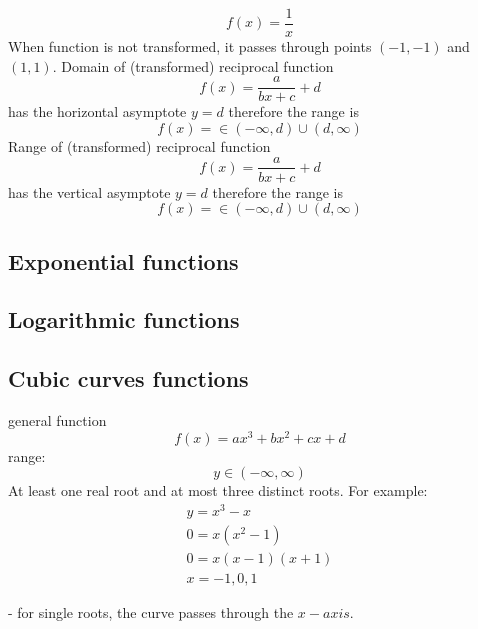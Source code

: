 \documentclass{article}
\begin{document}
\begin{equation}
  f(x) = \frac{1}{x}
\end{equation}
When function is not transformed, it passes through points $(-1, -1)$ and $(1, 1)$.
Domain of (transformed) reciprocal function
\begin{equation}
  f(x) = \frac{a}{bx+c} + d
\end{equation}
has the horizontal asymptote $y = d$ therefore the range is
\begin{equation}
  f(x) = \in (-\infty, d) \cup (d, \infty)
\end{equation}
Range of (transformed) reciprocal function
\begin{equation}
  f(x) = \frac{a}{bx+c} + d
\end{equation}
has the vertical asymptote $y = d$ therefore the range is
\begin{equation}
  f(x) = \in (-\infty, d) \cup (d, \infty)
\end{equation}


\subsection{Exponential functions}
\subsection{Logarithmic functions}
\subsection{Cubic curves functions}
general function
\begin{equation}
  f(x) = ax^3 + bx^2 + cx + d
\end{equation}
range:
\begin{equation}
  y \in (-\infty, \infty)
\end{equation}
At least one real root and at most three distinct roots. For example:
\begin{equation}
  \begin{gathered}
    y = x^3 - x \\
    0 = x(x^2 - 1) \\
    0 = x(x - 1)(x + 1) \\
    x = -1, 0, 1
  \end{gathered}
\end{equation}

- for single roots, the curve passes through the $x-axis$.
\end{document}
